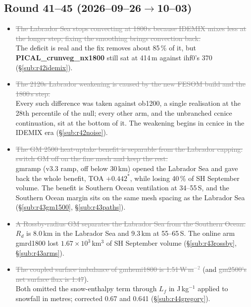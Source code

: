 \documentclass[10pt]{article}
\newcommand{\dead}[1]{\textcolor{gray}{\sout{#1}}}
\begin{document}
\subsection{Round 41--45 (2026--09--26$\to$10--03)}\label{sub:fals4145}

\begin{itemize}

\item \dead{The Labrador Sea stops convecting at 1800\,s because IDEMIX mixes less at the longer
      step; fixing the smoothing brings convection back.} \\ The deficit is real and the fix removes
      about 85\,\% of it, but \textbf{PICAL\_crunveg\_nx1800} still sat at 414\,m against ihf0's 370
      (\S\ref{sub:r42idemix}).

\item \dead{The 2120s Labrador weakening is caused by the new FESOM build and the 1800\,s step.}
      \\ Every such difference was taken against ob1200, a single realisation at the 28th
      percentile of the null; every other arm, and the unbranched ccnice continuation, sit at the
      bottom of it. The weakening begins in ccnice in the IDEMIX era (\S\ref{sub:r42noise}).

\item \dead{The GM 2500 heat-uptake benefit is separable from the Labrador capping: switch GM off on
      the fine mesh and keep the rest.} \\ gmramp (v3.3 ramp, off below 30\,km) opened the Labrador
      Sea and gave back the whole benefit, TOA $+0.442^*$, while losing 40\,\% of SH September volume.
      The benefit is Southern Ocean ventilation at 34--55\,S, and the Southern Ocean margin sits on the
      same mesh spacing as the Labrador Sea (\S\ref{sub:r43gm1500}, \S\ref{sub:r43paths}).

\item \dead{A Rossby-radius GM separates the Labrador Sea from the Southern Ocean.} \\ $R_d$ is
      8.0\,km in the Labrador Sea and 9.3\,km at 55--65\,S. The online arm gmrd1800 lost
      $1.67\times10^3$\,km$^3$ of SH September volume (\S\ref{sub:r43rossby}, \S\ref{sub:r43arms}).

\item \dead{The coupled surface imbalance of gmhemi1800 is 1.51\,W\,m$^{-2}$} (and
      \dead{gm2500's net surface flux is 1.47}). \\ Both omitted the snow-enthalpy term through
      $L_f$ in J\,kg$^{-1}$ applied to snowfall in metres; corrected 0.67 and 0.641
      (\S\ref{sub:r44gregory}).


\end{itemize}
\end{document}
